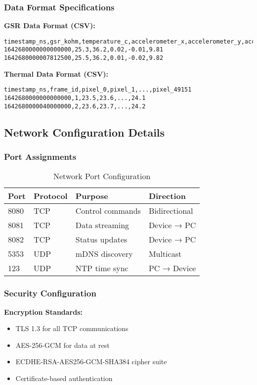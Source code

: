 \subsubsection{Data Format Specifications}

\textbf{GSR Data Format (CSV):}
\begin{verbatim}
timestamp_ns,gsr_kohm,temperature_c,accelerometer_x,accelerometer_y,accelerometer_z
1642680000000000000,25.3,36.2,0.02,-0.01,9.81
1642680000007812500,25.5,36.2,0.01,-0.02,9.82
\end{verbatim}

\textbf{Thermal Data Format (CSV):}
\begin{verbatim}
timestamp_ns,frame_id,pixel_0,pixel_1,...,pixel_49151
1642680000000000000,1,23.5,23.6,...,24.1
1642680000040000000,2,23.6,23.7,...,24.2
\end{verbatim}

\subsection{Network Configuration Details}

\subsubsection{Port Assignments}

\begin{table}[htbp]
\centering
\caption{Network Port Configuration}
\begin{tabular}{|l|l|l|l|}
\hline
\textbf{Port} & \textbf{Protocol} & \textbf{Purpose} & \textbf{Direction} \\
\hline
8080 & TCP & Control commands & Bidirectional \\
8081 & TCP & Data streaming & Device → PC \\
8082 & TCP & Status updates & Device → PC \\
5353 & UDP & mDNS discovery & Multicast \\
123 & UDP & NTP time sync & PC → Device \\
\hline
\end{tabular}
\end{table}

\subsubsection{Security Configuration}

\textbf{Encryption Standards:}
\begin{itemize}
\item TLS 1.3 for all TCP communications
\item AES-256-GCM for data at rest
\item ECDHE-RSA-AES256-GCM-SHA384 cipher suite
\item Certificate-based authentication
\end{itemize}


